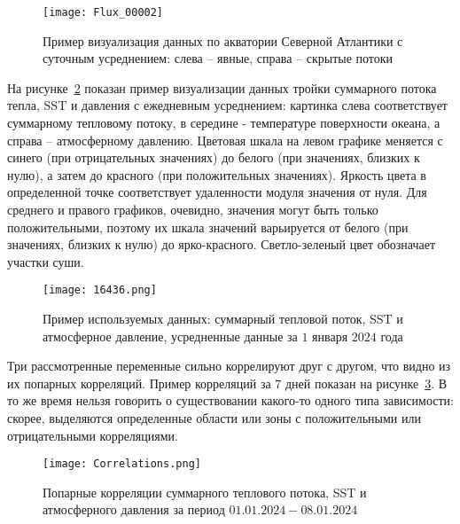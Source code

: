 \begin{figure}[!h]
	\centering
	\texttt{[image: Flux\_00002]}
	\caption{Пример визуализация данных по акватории Северной Атлантики с суточным усреднением: слева -- явные, справа -- скрытые потоки}
	\label{fig:flux_example}
\end{figure}


На рисунке~\ref{fig:data_example} показан пример визуализации данных тройки суммарного потока тепла, SST и давления с ежедневным усреднением: картинка слева соответствует суммарному тепловому потоку, в середине - температуре поверхности океана, а справа -- атмосферному давлению. Цветовая шкала на левом графике меняется с синего (при отрицательных значениях) до белого (при значениях, близких к нулю), а затем до красного (при положительных значениях). Яркость цвета в определенной точке соответствует удаленности модуля значения от нуля. Для среднего и правого графиков, очевидно, значения могут быть только положительными, поэтому их шкала значений варьируется от белого (при значениях, близких к нулю) до ярко-красного. Светло-зеленый цвет обозначает участки суши.


\begin{figure}
	\centering
	\texttt{[image: 16436.png]}
	\caption{Пример используемых данных: суммарный тепловой поток, SST и атмосферное давление, усредненные данные за $1$ января $2024$ года}
	\label{fig:data_example}
\end{figure}

Три рассмотренные переменные сильно коррелируют друг с другом, что видно из их попарных корреляций. Пример корреляций за $7$ дней показан на рисунке~\ref{fig:correlations}. В то же время нельзя говорить о существовании какого-то одного типа зависимости: скорее, выделяются определенные области или зоны с положительными или отрицательными корреляциями.

\begin{figure}
	\centering
	\texttt{[image: Correlations.png]}
	\caption{Попарные корреляции суммарного теплового потока, SST и атмосферного давления за период $01.01.2024-08.01.2024$}
	\label{fig:correlations}
\end{figure}


